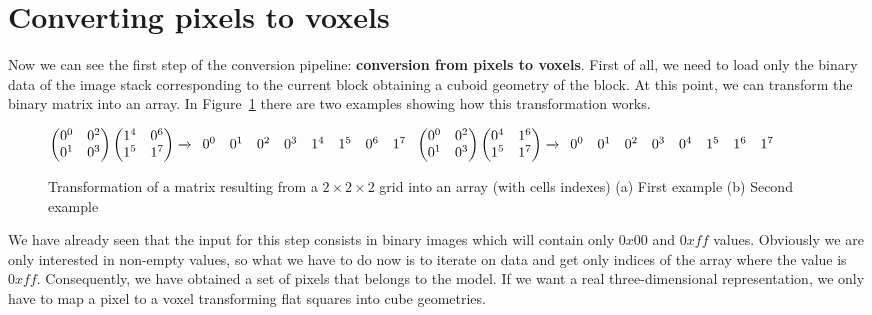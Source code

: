 \section{Converting pixels to voxels}\label{sec33:PixelsToVoxels}

Now we can see the first step of the conversion pipeline: \textbf{conversion from pixels to voxels}. First of all, we need to load only the binary data of the image stack corresponding to the current block obtaining a cuboid geometry of the block. At this point, we can transform the binary matrix into an array. In Figure~\ref{fig:linearizedMatrix} there are two examples showing how this transformation works.

\begin{figure}[htb] %
   \centering
    \begin{math}
    \begin{pmatrix}
    0^{0} & 0^{2}\\
    0^{1} & 0^{3}
    \end{pmatrix}   
    \begin{pmatrix}
    1^{4} & 0^{6}\\
    1^{5} & 1^{7}
    \end{pmatrix}
    \xrightarrow{}
    \begin{array}{c c c c c c c c}
      0^{0} & 0^{1} & 0^{2} & 0^{3} & 1^{4} & 1^{5} & 0^{6} & 1^{7}
    \end{array}
    $ $    
    \begin{pmatrix}
    0^{0} & 0^{2}\\
    0^{1} & 0^{3}
    \end{pmatrix}
   \begin{pmatrix}
    0^{4} & 1^{6}\\
    1^{5} & 1^{7}
    \end{pmatrix}
    \xrightarrow{}
    \begin{array}{c c c c c c c c}
      0^{0} & 0^{1} & 0^{2} & 0^{3} & 0^{4}  & 1^{5} & 1^{6} & 1^{7}
    \end{array}
    \end{math}
   \hfill
   \caption[Transformation of a matrix resulting from a $2\times 2\times 2$ grid into an array]{Transformation of a matrix resulting from a $2\times 2\times 2$ grid into an array (with cells indexes) (a) First example (b) Second example}
   \label{fig:linearizedMatrix}
\end{figure}

We have already seen that the input for this step consists in binary images which will contain only $0x00$ and $0xff$ values. Obviously we are only interested in non-empty values, so what we have to do now is to iterate on data and get only indices of the array where the value is $0xff$. Consequently, we have obtained a set of pixels that belongs to the model. If we want a real three-dimensional representation, we only have to map a pixel to a voxel transforming flat squares into cube geometries.\\

